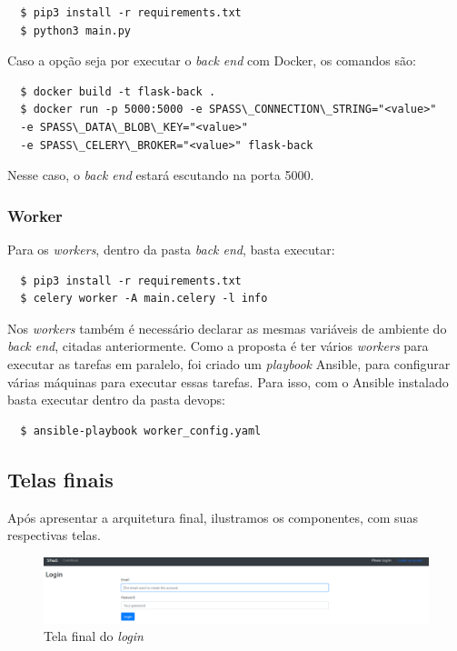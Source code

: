 \documentclass[11pt,twoside]{article}
\begin{document}
  \begin{verbatim}
  $ pip3 install -r requirements.txt
  $ python3 main.py
  \end{verbatim}

Caso a opção seja por executar o \emph{back end} com Docker, os comandos são:

  \begin{verbatim}
  $ docker build -t flask-back .
  $ docker run -p 5000:5000 -e SPASS\_CONNECTION\_STRING="<value>"
  -e SPASS\_DATA\_BLOB\_KEY="<value>"
  -e SPASS\_CELERY\_BROKER="<value>" flask-back
  \end{verbatim}

Nesse caso, o \emph{back end} estará escutando na porta 5000.

\subsubsection{Worker}

Para os \emph{workers}, dentro da pasta \emph{back end}, basta executar:

  \begin{verbatim}
  $ pip3 install -r requirements.txt
  $ celery worker -A main.celery -l info
  \end{verbatim}

Nos \emph{workers} também é necessário declarar as mesmas variáveis de ambiente do \emph{back end}, citadas anteriormente. 
Como a proposta é ter vários \emph{workers} para executar as tarefas em paralelo, foi criado um \emph{playbook} Ansible, para configurar várias máquinas para 
executar essas tarefas. Para isso, com o Ansible instalado basta executar dentro da pasta devops:

  \begin{verbatim}
  $ ansible-playbook worker_config.yaml
  \end{verbatim}

\subsection{Telas finais}

Após apresentar a arquitetura final, ilustramos os componentes, com suas respectivas telas. 

\begin{figure}[!h]
  \centering
  \includegraphics[scale=0.3]{final_login.eps}
  \caption{Tela final do \emph{login}}
  \label{fig:finalLogin}
\end{figure}
\end{document}
